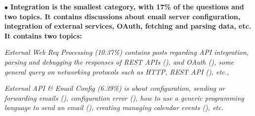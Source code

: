 



\nd\bf{$\bullet$ Integration} is the smallest category, with 17\% of the questions and two topics. It contains discussions about email server configuration, integration
of external services, OAuth, fetching and parsing data, etc. It contains two
topics: \begin{inparaenum}[(1)] \item \it{External Web Req Processing (10.37\%)}
contains posts regarding API integration, parsing and debugging the responses of
REST APIs (), and OAuth (), some general query on
networking protocols such as HTTP, REST API (), etc.,
\item \it{External API \& Email Config (6.39\%)} is about configuration, sending
or forwarding emails (), configuration error (), how
to use a generic programming language to send an email (), creating
managing calendar events (), etc.
\end{inparaenum} 

